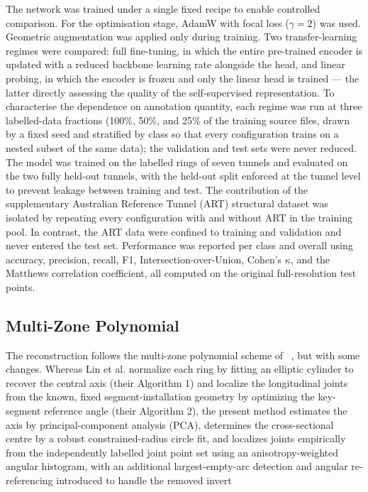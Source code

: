 \documentclass[preprint,12pt,authoryear]{elsarticle}
\begin{document}
The network was trained under a single fixed recipe to enable controlled
comparison. For the optimisation stage, AdamW with focal loss ($\gamma = 2$)
was used. Geometric augmentation was applied only during training. Two
transfer-learning regimes were compared: full fine-tuning, in which the
entire pre-trained encoder is updated with a reduced backbone learning
rate alongside the head, and linear probing, in which the encoder is
frozen and only the linear head is trained --- the latter directly
assessing the quality of the self-supervised representation. To
characterise the dependence on annotation quantity, each regime was run
at three labelled-data fractions (100\%, 50\%, and 25\% of the training
source files, drawn by a fixed seed and stratified by class so that
every configuration trains on a nested subset of the same data); the
validation and test sets were never reduced. The model was trained on
the labelled rings of seven tunnels and evaluated on the two fully
held-out tunnels, with the held-out split enforced at the tunnel level
to prevent leakage between training and test. The contribution of the
supplementary Australian Reference Tunnel (ART) structural dataset was
isolated by repeating every configuration with and without ART in the
training pool. In contrast, the ART data were confined to training and
validation and never entered the test set. Performance was reported per
class and overall using accuracy, precision, recall, F1,
Intersection-over-Union, Cohen's $\kappa$, and the Matthews correlation
coefficient, all computed on the original full-resolution test points.

\subsection{Multi-Zone Polynomial}\label{multi-zone-polynomial}

The reconstruction follows the multi-zone polynomial scheme of ~\citep{Lin2025}, 
but with some changes. Whereas Lin et al. normalize each
ring by fitting an elliptic cylinder to recover the central axis (their
Algorithm 1) and localize the longitudinal joints from the known, fixed
segment-installation geometry by optimizing the key-segment reference
angle (their Algorithm 2), the present method estimates the axis by
principal-component analysis (PCA), determines the cross-sectional
centre by a robust constrained-radius circle fit, and localizes joints
empirically from the independently labelled joint point set using an
anisotropy-weighted angular histogram, with an additional
largest-empty-arc detection and angular re-referencing introduced to
handle the removed invert
\end{document}
